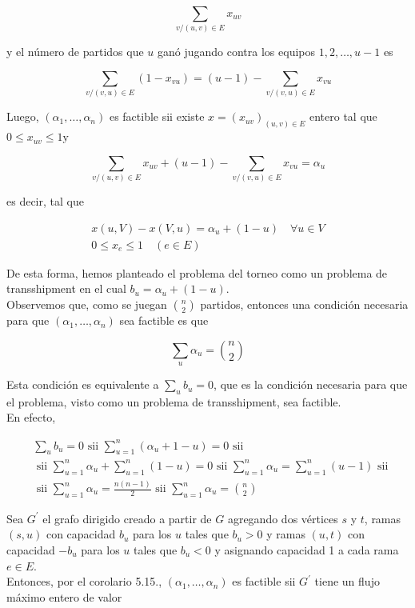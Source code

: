 \documentclass[10pt]{article}
\begin{document}
$$
\sum_{v /(u, v) \in E} x_{u v}
$$

y el número de partidos que $u$ ganó jugando contra los equipos $1,2, \ldots, u-1$ es

$$
\sum_{v /(v, u) \in E}\left(1-x_{v u}\right)=(u-1)-\sum_{v /(v, u) \in E} x_{v u}
$$

Luego, $\left(\alpha_{1}, \ldots, \alpha_{n}\right)$ es factible sii existe $x=\left(x_{u v}\right)_{(u, v) \in E}$ entero tal que $0 \leq x_{u v} \leq 1 \mathrm{y}$

$$
\sum_{v /(u, v) \in E} x_{u v}+(u-1)-\sum_{v /(v, u) \in E} x_{v u}=\alpha_{u}
$$

es decir, tal que

$$
\begin{gathered}
x(u, V)-x(V, u)=\alpha_{u}+(1-u) \quad \forall u \in V \\
0 \leq x_{e} \leq 1 \quad(e \in E)
\end{gathered}
$$

De esta forma, hemos planteado el problema del torneo como un problema de transshipment en el cual $b_{u}=\alpha_{u}+(1-u)$.\\
Observemos que, como se juegan $\binom{n}{2}$ partidos, entonces una condición necesaria para que $\left(\alpha_{1}, \ldots, \alpha_{n}\right)$ sea factible es que

$$
\sum_{u} \alpha_{u}=\binom{n}{2}
$$

Esta condición es equivalente a $\sum_{u} b_{u}=0$, que es la condición necesaria para que el problema, visto como un problema de transshipment, sea factible.\\
En efecto,

$$
\begin{aligned}
& \sum_{u} b_{u}=0 \text { sii } \sum_{u=1}^{n}\left(\alpha_{u}+1-u\right)=0 \text { sii } \\
& \text { sii } \sum_{u=1}^{n} \alpha_{u}+\sum_{u=1}^{n}(1-u)=0 \text { sii } \sum_{u=1}^{n} \alpha_{u}=\sum_{u=1}^{n}(u-1) \text { sii } \\
& \text { sii } \sum_{u=1}^{n} \alpha_{u}=\frac{n(n-1)}{2} \text { sii } \sum_{u=1}^{n} \alpha_{u}=\binom{n}{2}
\end{aligned}
$$

Sea $G^{\prime}$ el grafo dirigido creado a partir de $G$ agregando dos vértices $s$ y $t$, ramas $(s, u)$ con capacidad $b_{u}$ para los $u$ tales que $b_{u}>0$ y ramas $(u, t)$ con capacidad $-b_{u}$ para los $u$ tales que $b_{u}<0$ y asignando capacidad 1 a cada rama $e \in E$.\\
Entonces, por el corolario 5.15., $\left(\alpha_{1}, \ldots, \alpha_{n}\right)$ es factible sii $G^{\prime}$ tiene un flujo máximo entero de valor
\end{document}
